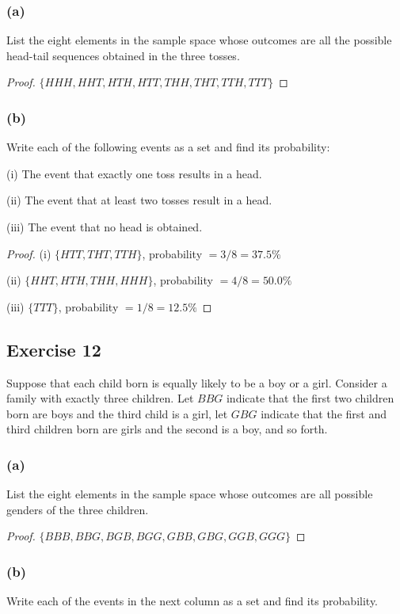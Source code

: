 \documentclass[14pt]{extarticle}
\begin{document}
\subsubsection{(a)}
List the eight elements in the sample space whose outcomes are all the possible head-tail sequences obtained in the 
three tosses.

\begin{proof}
\(\{HHH, HHT, HTH, HTT, THH, THT, TTH, TTT\}\)
\end{proof}

\subsubsection{(b)}
Write each of the following events as a set and find its probability:

(i) The event that exactly one toss results in a head.

(ii) The event that at least two tosses result in a head.

(iii) The event that no head is obtained.

\begin{proof}
(i) \(\{HTT, THT, TTH\}\), probability \(= 3/8 = 37.5\%\)

(ii) \(\{HHT, HTH, THH, HHH\}\), probability \(= 4/8 = 50.0\%\)

(iii) \(\{TTT\}\), probability \(= 1/8 = 12.5\%\)
\end{proof}

\subsection{Exercise 12}
Suppose that each child born is equally likely to be a boy or a girl. Consider a family with exactly three children. 
Let \(BBG\) indicate that the first two children born are boys and the third child is a girl, let \(GBG\) indicate 
that the first and third children born are girls and the second is a boy, and so forth.

\subsubsection{(a)}
List the eight elements in the sample space whose outcomes are all possible genders of the three children.

\begin{proof}
\(\{BBB, BBG, BGB, BGG, GBB, GBG, GGB, GGG\}\)
\end{proof}

\subsubsection{(b)}
Write each of the events in the next column as a set and find its probability.
\end{document}
